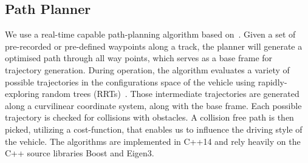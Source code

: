 \subsection{Path Planner}\label{sec:6:pathplanner}
We use a real-time capable path-planning algorithm based on~\cite{chu_local_2012}.
Given a set of pre-recorded or pre-defined waypoints along a track, the planner will generate a optimised path through all way points, which serves as a base frame for trajectory generation.
During operation, the algorithm evaluates a variety of possible trajectories in the configurations space of the vehicle using rapidly-exploring random trees (RRTs)~\cite{lavalle_planning_2006}.
Those intermediate trajectories are generated along a curvilinear coordinate system, along with the base frame.
Each possible trajectory is checked for collisions with obstacles. A collision free path is then picked, utilizing a cost-function, that enables us to influence the driving style of the vehicle.
The algorithms are implemented in C++14 and rely heavily on the C++ source libraries Boost and Eigen3.


